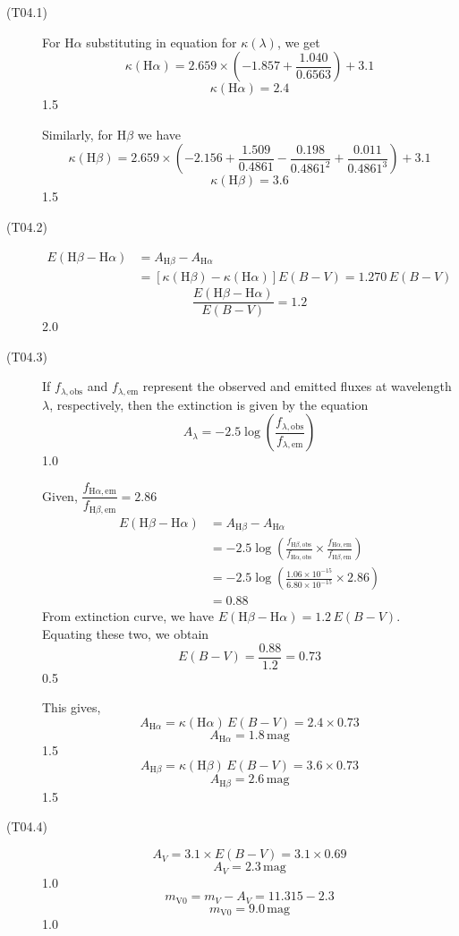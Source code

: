 \begin{description}
\item[(T04.1)] For H$\alpha$ substituting in equation for $\kappa(\lambda)$,
  we get
  \[ \kappa(\mathrm{H}\alpha)
     = 2.659\times\left(-1.857+\frac{1.040}{0.6563}\right) + 3.1 \]
  \[ \boxed{\kappa(\mathrm{H}\alpha) = 2.4} \]
  \hfill 1.5

  Similarly, for H$\beta$ we have
  \[ \kappa(\mathrm{H}\beta)
     = 2.659\times\left(-2.156+\frac{1.509}{0.4861}
       -\frac{0.198}{0.4861^2}+\frac{0.011}{0.4861^3}\right) + 3.1 \]
  \[ \boxed{\kappa(\mathrm{H}\beta) = 3.6} \]
  \hfill 1.5
\item[(T04.2)]
  \begin{align*}
  E(\mathrm{H}\beta-\mathrm{H}\alpha)
    &= A_{\mathrm{H}\beta} - A_{\mathrm{H}\alpha}
    \tag*{2.0}\\
    &= \left[\kappa(\mathrm{H}\beta)-\kappa(\mathrm{H}\alpha)\right]
       E(B-V) = 1.270\,E(B-V)
  \end{align*}
  \[ \boxed{\frac{E(\mathrm{H}\beta-\mathrm{H}\alpha)}{E(B-V)} = 1.2} \]
  \hfill 2.0
\item[(T04.3)] If $f_{\lambda,\mathrm{obs}}$ and $f_{\lambda,\mathrm{em}}$
  represent the observed and emitted fluxes at wavelength $\lambda$,
  respectively, then the extinction is given by the equation
  \[ A_\lambda = -2.5\log
     \left(\frac{f_{\lambda,\mathrm{obs}}}{f_{\lambda,\mathrm{em}}}\right) \]
  \hfill 1.0

  Given, $\dfrac{f_{\mathrm{H}\alpha,\mathrm{em}}}
    {f_{\mathrm{H}\beta,\mathrm{em}}} = 2.86$
  \begin{align*}
  E(\mathrm{H}\beta-\mathrm{H}\alpha)
    &= A_{\mathrm{H}\beta} - A_{\mathrm{H}\alpha}\\
    &= -2.5\log\left(
       \frac{f_{\mathrm{H}\beta,\mathrm{obs}}}
            {f_{\mathrm{H}\alpha,\mathrm{obs}}}\times
       \frac{f_{\mathrm{H}\alpha,\mathrm{em}}}
            {f_{\mathrm{H}\beta,\mathrm{em}}}\right)\\
    &= -2.5\log\left(\frac{1.06\times10^{-15}}{6.80\times10^{-15}}
       \times2.86\right)\\
    &= 0.88
    \tag*{1.5}
  \end{align*}
  From extinction curve, we have
  $E(\mathrm{H}\beta-\mathrm{H}\alpha) = 1.2\,E(B-V)$.\\
  Equating these two, we obtain
  \[ E(B-V) = \frac{0.88}{1.2} = 0.73 \]
  \hfill 0.5

  This gives,
  \[ A_{\mathrm{H}\alpha} = \kappa(\mathrm{H}\alpha)\,E(B-V)
     = 2.4\times0.73 \]
  \[ \boxed{A_{\mathrm{H}\alpha} = 1.8\,\mathrm{mag}} \]
  \hfill 1.5
  \[ A_{\mathrm{H}\beta} = \kappa(\mathrm{H}\beta)\,E(B-V)
     = 3.6\times0.73 \]
  \[ \boxed{A_{\mathrm{H}\beta} = 2.6\,\mathrm{mag}} \]
  \hfill 1.5
\item[(T04.4)]
  \[ A_V = 3.1\times E(B-V) = 3.1\times0.69 \]
  \[ \boxed{A_V = 2.3\,\mathrm{mag}} \]
  \hfill 1.0
  \[ m_{\mathrm{V0}} = m_V - A_V = 11.315 - 2.3 \]
  \[ \boxed{m_{\mathrm{V0}} = 9.0\,\mathrm{mag}} \]
  \hfill 1.0
\end{description}
